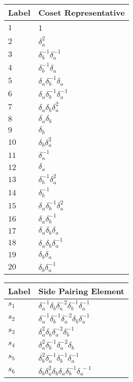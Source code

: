 \documentclass{article}
\begin{document}
\begin{center}
\begin{tabular}{ll}
\toprule
Label & Coset Representative\\
\midrule
$1$ & 1 \\
$2$ & $\delta_a^{2}$ \\
$3$ & $\delta_b^{-1}\delta_a^{-1}$ \\
$4$ & $\delta_b^{-1}\delta_a^{}$ \\
$5$ & $\delta_a^{}\delta_b^{-1}\delta_a^{}$ \\
$6$ & $\delta_a^{}\delta_b^{-1}\delta_a^{-1}$ \\
$7$ & $\delta_a^{}\delta_b^{}\delta_a^{2}$ \\
$8$ & $\delta_a^{}\delta_b^{}$ \\
$9$ & $\delta_b^{}$ \\
$10$ & $\delta_b^{}\delta_a^{2}$ \\
$11$ & $\delta_a^{-1}$ \\
$12$ & $\delta_a^{}$ \\
$13$ & $\delta_b^{-1}\delta_a^{2}$ \\
$14$ & $\delta_b^{-1}$ \\
$15$ & $\delta_a^{}\delta_b^{-1}\delta_a^{2}$ \\
$16$ & $\delta_a^{}\delta_b^{-1}$ \\
$17$ & $\delta_a^{}\delta_b^{}\delta_a^{}$ \\
$18$ & $\delta_a^{}\delta_b^{}\delta_a^{-1}$ \\
$19$ & $\delta_b^{}\delta_a^{}$ \\
$20$ & $\delta_b^{}\delta_a^{-1}$ \\
\bottomrule
\end{tabular}
\hfill
\begin{tabular}{ll}
\toprule
Label & Side Pairing Element\\
\midrule
$s_{1}$ & $\delta_a^{-1}\delta_b^{}\delta_a^{-2}\delta_b^{-1}\delta_a^{-1}$ \\
$s_{2}$ & $\delta_a^{-1}\delta_b^{-1}\delta_a^{-2}\delta_b^{}\delta_a^{-1}$ \\
$s_{3}$ & $\delta_a^{2}\delta_b^{}\delta_a^{-2}\delta_b^{-1}$ \\
$s_{4}$ & $\delta_a^{2}\delta_b^{-1}\delta_a^{-2}\delta_b^{}$ \\
$s_{5}$ & $\delta_b^{2}\delta_a^{-1}\delta_b^{-1}\delta_a^{-1}$ \\
$s_{6}$ & $\delta_b^{}\delta_a^{2}\delta_b^{}\delta_a^{}\delta_b^{-1}\delta_a^{\
-1}$ \\

\end{tabular}
\end{center}
\end{document}
